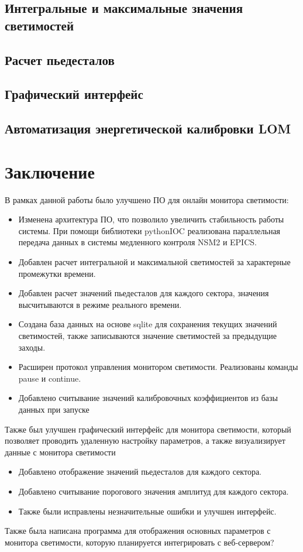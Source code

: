 \documentclass[a4paper, 14pt]{extarticle}
\let\stdsection\section
\renewcommand\section{\newpage\stdsection}
\begin{document}
    \subsection{Интегральные и максимальные значения светимостей}
    
    \subsection{Расчет пьедесталов}
    
    \subsection{Графический интерфейс}
    
    \subsection{Автоматизация энергетической калибровки LOM}
    
\section*{Заключение}
    В рамках данной работы было улучшено ПО для онлайн монитора светимости:
    \begin{itemize}
        \item Изменена архитектура ПО, что позволило увеличить стабильность работы системы. При помощи библиотеки pythonIOC реализована параллельная передача данных в системы медленного контроля NSM2 и EPICS.
        \item Добавлен расчет интегральной и максимальной светимостей за характерные промежутки времени.
        \item Добавлен расчет значений пьедесталов для каждого сектора, значения высчитываются в режиме реального времени.
        \item Создана база данных на основе sqlite для сохранения текущих значений светимостей, также записываются значение светимостей за предыдущие заходы.
        \item Расширен протокол управления монитором светимости. Реализованы команды pause и continue.
        \item Добавлено считывание значений калибровочных коэффициентов из базы данных при запуске
    \end{itemize}
    
    Также был улучшен графический интерфейс для монитора светимости, который позволяет проводить удаленную настройку параметров, а также визуализирует данные с монитора светимости
    \begin{itemize} 
        \item Добавлено отображение значений пьедесталов для каждого сектора.
        \item Добавлено считывание порогового значения амплитуд для каждого сектора.
        \item Также были исправлены незначительные ошибки и улучшен интерфейс.
    \end{itemize}
    
    Также была написана программа для отображения основных параметров с монитора светимости, которую планируется интегрировать с веб-сервером?
%
 
\end{document}

